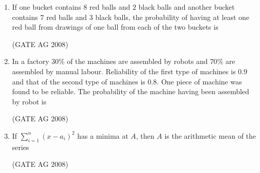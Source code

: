 \documentclass[journal]{IEEEtran}
\begin{document}
\begin{enumerate}
\medskip

\item 
 If one bucket contains $8$ red balls and $2$ black balls and another bucket contains $7$ red balls and $3$ black balls, the probability of having at least one red ball from drawings of one ball from each of the two buckets is
\begin{enumerate}
\end{enumerate}
\hfill(GATE AG 2008)\\

\medskip

\item 
 In a factory $30\%$ of the machines are assembled by robots and $70\%$ are assembled by manual labour. Reliability of the first type of machines is $0.9$ and that of the second type of machines is $0.8$. One piece of machine was found to be reliable. The probability of the machine having been assembled by robot is
\begin{enumerate}
\end{enumerate}
\hfill(GATE AG 2008)\\

\medskip

\item 
 If  $\sum_{i=1}^n (x - a_i)^2$ has a minima at $A$, then $A$ is the arithmetic mean of the series
\begin{enumerate}
\end{enumerate}
\hfill(GATE AG 2008)\\


\end{enumerate}
\end{document}
